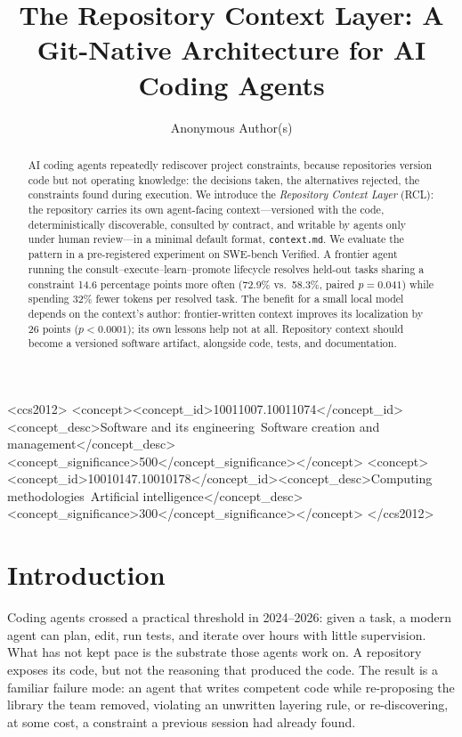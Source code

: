 \documentclass[sigconf,review,anonymous]{acmart}
\newcommand{\ctx}{\texttt{context.md}}
\begin{document}
\title{The Repository Context Layer: A Git-Native Architecture for AI Coding Agents}

\author{Anonymous Author(s)}

\begin{abstract}
AI coding agents repeatedly rediscover project constraints, because repositories version code but not operating knowledge: the decisions taken, the alternatives rejected, the constraints found during execution. We introduce the \emph{Repository Context Layer} (RCL): the repository carries its own agent-facing context---versioned with the code, deterministically discoverable, consulted by contract, and writable by agents only under human review---in a minimal default format, \ctx{}. We evaluate the pattern in a pre-registered experiment on SWE-bench Verified. A frontier agent running the consult--execute--learn--promote lifecycle resolves held-out tasks sharing a constraint 14.6 percentage points more often (72.9\% vs.\ 58.3\%, paired $p=0.041$) while spending 32\% fewer tokens per resolved task. The benefit for a small local model depends on the context's author: frontier-written context improves its localization by 26 points ($p<0.0001$); its own lessons help not at all. Repository context should become a versioned software artifact, alongside code, tests, and documentation.
\end{abstract}

\begin{CCSXML}
<ccs2012>
<concept><concept_id>10011007.10011074</concept_id><concept_desc>Software and its engineering~Software creation and management</concept_desc><concept_significance>500</concept_significance></concept>
<concept><concept_id>10010147.10010178</concept_id><concept_desc>Computing methodologies~Artificial intelligence</concept_desc><concept_significance>300</concept_significance></concept>
</ccs2012>
\end{CCSXML}

\maketitle

\section{Introduction}
Coding agents crossed a practical threshold in 2024--2026: given a task, a modern agent can plan, edit, run tests, and iterate over hours with little supervision. What has not kept pace is the substrate those agents work on. A repository exposes its code, but not the reasoning that produced the code. The result is a familiar failure mode: an agent that writes competent code while re-proposing the library the team removed, violating an unwritten layering rule, or re-discovering, at some cost, a constraint a previous session had already found.
\end{document}
